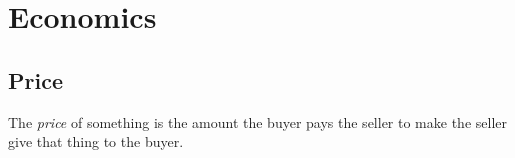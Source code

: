 \chapter{Economics}

\section{Price}

The \emph{price} of something is the amount the buyer
pays the seller to make the seller give that thing to the buyer.

